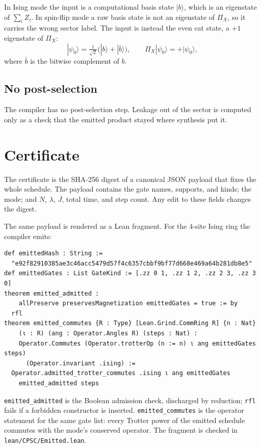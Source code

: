 \documentclass[11pt]{article}
\theoremstyle{definition}
\newcommand{\lean}[1]{\texttt{#1}}
\newcommand{\PiX}{\Pi_X}
\begin{document}
In Ising mode the input is a computational basis state $|b\rangle$, which is an eigenstate of $\sum_i Z_i$. In spin-flip mode a raw basis state is not an eigenstate of $\PiX$, so it carries the wrong sector label. The input is instead the even cat state, a $+1$ eigenstate of $\PiX$:
\begin{equation}
  |\psi_0\rangle = \tfrac{1}{\sqrt2}\bigl(|b\rangle + |\bar b\rangle\bigr), \qquad \PiX|\psi_0\rangle = +|\psi_0\rangle ,
\end{equation}
where $\bar b$ is the bitwise complement of $b$.

\subsection{No post-selection}

The compiler has no post-selection step. Leakage out of the sector is computed only as a check that the emitted product stayed where synthesis put it.

\section{Certificate}
\label{sec:cert}

The certificate is the SHA-256 digest of a canonical JSON payload that fixes the whole schedule. The payload contains the gate names, supports, and kinds; the mode; and $N$, $\lambda$, $J$, total time, and step count. Any edit to these fields changes the digest.

The same payload is rendered as a Lean fragment. For the 4-site Ising ring the compiler emits:
\begin{Verbatim}
def emittedHash : String :=
  "e92f82910385ae3c46acc5479d57f4c6357cbbf9bf77d668e469a64b281db8e5"
def emittedGates : List GateKind := [.zz 0 1, .zz 1 2, .zz 2 3, .zz 3 0]
theorem emitted_admitted :
    allPreserve preservesMagnetization emittedGates = true := by
  rfl
theorem emitted_commutes {R : Type} [Lean.Grind.CommRing R] {n : Nat}
    (ι : R) (ang : Operator.Angles R) (steps : Nat) :
    Operator.Commutes (Operator.trotterOp (n := n) ι ang emittedGates steps)
      (Operator.invariant .ising) :=
  Operator.admitted_trotter_commutes .ising ι ang emittedGates
    emitted_admitted steps
\end{Verbatim}
\lean{emitted\_admitted} is the Boolean admission check, discharged by reduction; \lean{rfl} fails if a forbidden constructor is inserted. \lean{emitted\_commutes} is the operator statement for the same gate list: every Trotter power of the emitted schedule commutes with the mode's conserved operator. The fragment is checked in \lean{lean/CPSC/Emitted.lean}.
\end{document}
